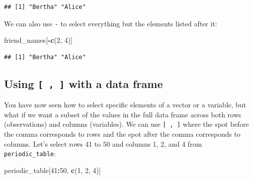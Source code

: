 \documentclass[]{tufte-book}
\newenvironment{Shaded}{\begin{snugshade}}{\end{snugshade}}
\newcommand{\DecValTok}[1]{\textcolor[rgb]{0.00,0.00,0.81}{#1}}
\newcommand{\FunctionTok}[1]{\textcolor[rgb]{0.13,0.29,0.53}{\textbf{#1}}}
\newcommand{\NormalTok}[1]{#1}
\newcommand{\SpecialCharTok}[1]{\textcolor[rgb]{0.81,0.36,0.00}{\textbf{#1}}}
\begin{document}
\begin{verbatim}
## [1] "Bertha" "Alice"
\end{verbatim}

We can also use \texttt{-} to select everything but the elements listed after it:

\begin{Shaded}
\begin{Highlighting}[]
\NormalTok{friend\_names[}\SpecialCharTok{{-}}\FunctionTok{c}\NormalTok{(}\DecValTok{2}\NormalTok{, }\DecValTok{4}\NormalTok{)]}
\end{Highlighting}
\end{Shaded}

\begin{verbatim}
## [1] "Bertha" "Alice"
\end{verbatim}

\subsection{\texorpdfstring{Using \texttt{{[}\ ,\ {]}} with a data frame}{Using {[} , {]} with a data frame}}\label{using-with-a-data-frame}

You have now seen how to select specific elements of a vector or a variable, but what if we want a subset of the values in the full data frame across both rows (observations) and columns (variables). We can use \texttt{{[}\ ,\ {]}} where the spot before the comma corresponds to rows and the spot after the comma corresponds to columns. Let's select rows 41 to 50 and columns 1, 2, and 4 from \texttt{periodic\_table}:

\begin{Shaded}
\begin{Highlighting}[]
\NormalTok{periodic\_table[}\DecValTok{41}\SpecialCharTok{:}\DecValTok{50}\NormalTok{, }\FunctionTok{c}\NormalTok{(}\DecValTok{1}\NormalTok{, }\DecValTok{2}\NormalTok{, }\DecValTok{4}\NormalTok{)]}
\end{Highlighting}
\end{Shaded}
\end{document}
